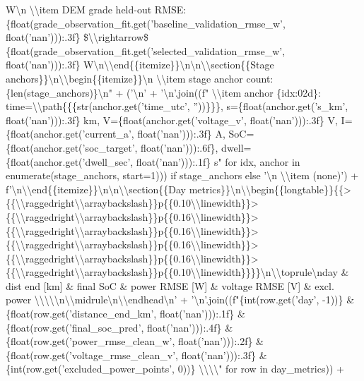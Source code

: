 \documentclass[a4paper,11pt]{article}
\begin{document}
\begin{enumerate}[leftmargin=1.8em]
W\textbackslash{}n  \textbackslash{}\textbackslash{}item DEM grade held-out RMSE: \{float(grade\_observation\_fit.get('baseline\_validation\_rmse\_w', float('nan'))):.3f\} \$\textbackslash{}\textbackslash{}rightarrow\$ \{float(grade\_observation\_fit.get('selected\_validation\_rmse\_w', float('nan'))):.3f\} W\textbackslash{}n\textbackslash{}\textbackslash{}end\{\{itemize\}\}\textbackslash{}n\textbackslash{}n\textbackslash{}\textbackslash{}section\{\{Stage anchors\}\}\textbackslash{}n\textbackslash{}\textbackslash{}begin\{\{itemize\}\}\textbackslash{}n  \textbackslash{}\textbackslash{}item stage anchor count: \{len(stage\_anchors)\}\textbackslash{}n" + ('\textbackslash{}n' + '\textbackslash{}n'.join((f"  \textbackslash{}\textbackslash{}item anchor \{idx:02d\}: time=\textbackslash{}\textbackslash{}path\{\{\{str(anchor.get('time\_utc', ''))\}\}\}, s=\{float(anchor.get('s\_km', float('nan'))):.3f\} km, V=\{float(anchor.get('voltage\_v', float('nan'))):.3f\} V, I=\{float(anchor.get('current\_a', float('nan'))):.3f\} A, SoC=\{float(anchor.get('soc\_target', float('nan'))):.6f\}, dwell=\{float(anchor.get('dwell\_sec', float('nan'))):.1f\} s" for idx, anchor in enumerate(stage\_anchors, start=1))) if stage\_anchors else '\textbackslash{}n  \textbackslash{}\textbackslash{}item (none)') + f'\textbackslash{}n\textbackslash{}\textbackslash{}end\{\{itemize\}\}\textbackslash{}n\textbackslash{}n\textbackslash{}\textbackslash{}section\{\{Day metrics\}\}\textbackslash{}n\textbackslash{}\textbackslash{}begin\{\{longtable\}\}\{\{>\{\{\textbackslash{}\textbackslash{}raggedright\textbackslash{}\textbackslash{}arraybackslash\}\}p\{\{0.10\textbackslash{}\textbackslash{}linewidth\}\}>\{\{\textbackslash{}\textbackslash{}raggedright\textbackslash{}\textbackslash{}arraybackslash\}\}p\{\{0.16\textbackslash{}\textbackslash{}linewidth\}\}>\{\{\textbackslash{}\textbackslash{}raggedright\textbackslash{}\textbackslash{}arraybackslash\}\}p\{\{0.16\textbackslash{}\textbackslash{}linewidth\}\}>\{\{\textbackslash{}\textbackslash{}raggedright\textbackslash{}\textbackslash{}arraybackslash\}\}p\{\{0.16\textbackslash{}\textbackslash{}linewidth\}\}>\{\{\textbackslash{}\textbackslash{}raggedright\textbackslash{}\textbackslash{}arraybackslash\}\}p\{\{0.16\textbackslash{}\textbackslash{}linewidth\}\}>\{\{\textbackslash{}\textbackslash{}raggedright\textbackslash{}\textbackslash{}arraybackslash\}\}p\{\{0.10\textbackslash{}\textbackslash{}linewidth\}\}\}\}\textbackslash{}n\textbackslash{}\textbackslash{}toprule\textbackslash{}nday \& dist end [km] \& final SoC \& power RMSE [W] \& voltage RMSE [V] \& excl. power \textbackslash{}\textbackslash{}\textbackslash{}\textbackslash{}\textbackslash{}n\textbackslash{}\textbackslash{}midrule\textbackslash{}n\textbackslash{}\textbackslash{}endhead\textbackslash{}n' + '\textbackslash{}n'.join((f"\{int(row.get('day', -1))\} \& \{float(row.get('distance\_end\_km', float('nan'))):.1f\} \& \{float(row.get('final\_soc\_pred', float('nan'))):.4f\} \& \{float(row.get('power\_rmse\_clean\_w', float('nan'))):.2f\} \& \{float(row.get('voltage\_rmse\_clean\_v', float('nan'))):.3f\} \& \{int(row.get('excluded\_power\_points', 0))\} \textbackslash{}\textbackslash{}\textbackslash{}\textbackslash{}" for row in day\_metrics)) + 
\end{enumerate}
\end{document}
